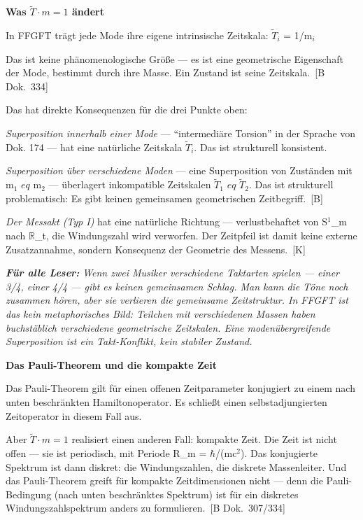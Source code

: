 \documentclass[11pt,oneside]{book}
\newcommand{\status}[1]{\penalty10000\,{\scriptsize\textcolor{gray!60}{[#1]}}}
\newenvironment{laierspur}{%
  \par\vspace{4pt}%
  \noindent\small\itshape\color{blue!60!black}%
  \textbf{Für alle Leser:}\enspace\ignorespaces}{%
  \par\vspace{4pt}\normalsize\normalfont\normalcolor}
\begin{document}
\textbf{Was $\tilde{T}\cdot m=1$ ändert}


In FFGFT trägt jede Mode ihre eigene intrinsische Zeitskala:
$\tilde{T}_i$ = 1/m$_i$


Das ist keine phänomenologische Größe — es ist eine geometrische
Eigenschaft der Mode, bestimmt durch ihre Masse. Ein Zustand ist
seine Zeitskala. \status{B Dok.~334}


Das hat direkte Konsequenzen für die drei Punkte oben:


\textit{Superposition innerhalb einer Mode} — \enquote{intermediäre Torsion} in der
Sprache von Dok. 174 — hat eine natürliche Zeitskala $\tilde{T}_i$. Das ist
strukturell konsistent.


\textit{Superposition über verschiedene Moden} — eine Superposition von
Zuständen mit m$_1$ $
eq$ m$_2$ — überlagert inkompatible Zeitskalen
$\tilde{T}_1$ $
eq$ $\tilde{T}_2$. Das ist strukturell problematisch: Es gibt keinen
gemeinsamen geometrischen Zeitbegriff. \status{B}


\textit{Der Messakt (Typ I)} hat eine natürliche Richtung — verlustbehaftet
von S$^1$\_m nach $\mathbb{R}$\_t, die Windungszahl wird verworfen. Der Zeitpfeil ist
damit keine externe Zusatzannahme, sondern Konsequenz der Geometrie
des Messens. \status{K}


\begin{laierspur}
Wenn zwei Musiker verschiedene Taktarten spielen —
einer 3/4, einer 4/4 — gibt es keinen gemeinsamen Schlag. Man
kann die Töne noch zusammen hören, aber sie verlieren die
gemeinsame Zeitstruktur. In FFGFT ist das kein metaphorisches
Bild: Teilchen mit verschiedenen Massen haben buchstäblich
verschiedene geometrische Zeitskalen. Eine modenübergreifende
Superposition ist ein Takt-Konflikt, kein stabiler Zustand.
\end{laierspur}

\textbf{Das Pauli-Theorem und die kompakte Zeit}


Das Pauli-Theorem gilt für einen offenen Zeitparameter konjugiert zu
einem nach unten beschränkten Hamiltonoperator. Es schließt einen
selbstadjungierten Zeitoperator in diesem Fall aus.


Aber $\tilde{T}\cdot m=1$ realisiert einen anderen Fall: kompakte Zeit. Die Zeit
ist nicht offen — sie ist periodisch, mit Periode R\_m = $\hbar$/(mc$^2$).
Das konjugierte Spektrum ist dann diskret: die Windungszahlen, die
diskrete Massenleiter. Und das Pauli-Theorem greift für kompakte
Zeitdimensionen nicht — denn die Pauli-Bedingung (nach unten
beschränktes Spektrum) ist für ein diskretes Windungszahlspektrum
anders zu formulieren. \status{B Dok.~307/334}
\end{document}
